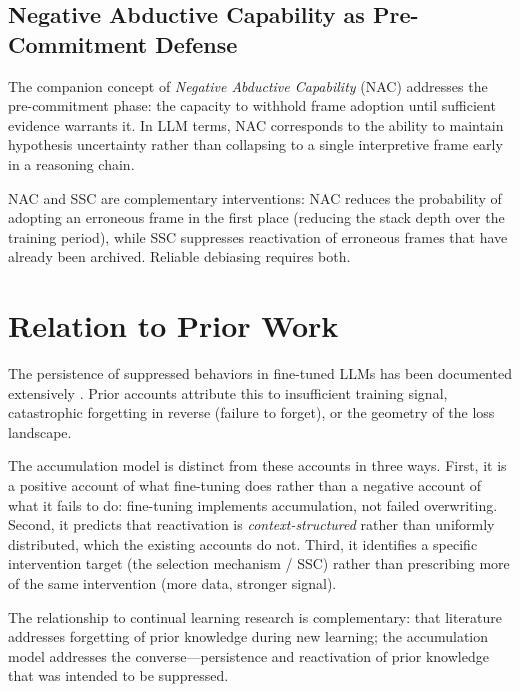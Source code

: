 \documentclass[12pt]{article}
\begin{document}
\subsection{Negative Abductive Capability as Pre-Commitment Defense}

The companion concept of \emph{Negative Abductive Capability}
(NAC) \cite{minamoto2026overwrite} addresses the pre-commitment
phase: the capacity to withhold frame adoption until sufficient
evidence warrants it. In LLM terms, NAC corresponds to the ability
to maintain hypothesis uncertainty rather than collapsing to a
single interpretive frame early in a reasoning chain.

NAC and SSC are complementary interventions: NAC reduces the
probability of adopting an erroneous frame in the first place
(reducing the stack depth over the training period), while SSC
suppresses reactivation of erroneous frames that have already
been archived. Reliable debiasing requires both.

\section{Relation to Prior Work}

The persistence of suppressed behaviors in fine-tuned LLMs has been
documented extensively \cite{perez2022ignore, wei2023jailbroken,
yang2023shadow, qi2023fine}. Prior accounts attribute this to
insufficient training signal, catastrophic forgetting in reverse
(failure to forget), or the geometry of the loss landscape.

The accumulation model is distinct from these accounts in three ways.
First, it is a positive account of what fine-tuning does rather than
a negative account of what it fails to do: fine-tuning implements
accumulation, not failed overwriting. Second, it predicts that
reactivation is \emph{context-structured} rather than uniformly
distributed, which the existing accounts do not. Third, it identifies
a specific intervention target (the selection mechanism / SSC)
rather than prescribing more of the same intervention (more data,
stronger signal).

The relationship to continual learning research
\cite{mccloskey1989catastrophic, kirkpatrick2017overcoming} is
complementary: that literature addresses forgetting of prior
knowledge during new learning; the accumulation model addresses
the converse---persistence and reactivation of prior knowledge
that was intended to be suppressed.
\end{document}
